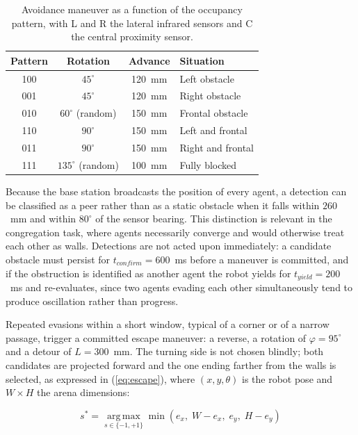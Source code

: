 \documentclass[conference]{IEEEtran}
\begin{document}
\begin{table}[htbp]
\caption{Avoidance maneuver as a function of the occupancy pattern, with L
and R the lateral infrared sensors and C the central proximity sensor.}
\label{tab:avoidance}
\centering
\begin{tabular}{cccl}
\hline
\textbf{Pattern} & \textbf{Rotation} & \textbf{Advance} & \textbf{Situation} \\
\hline
100 & $45^\circ$          & 120~mm & Left obstacle \\
001 & $45^\circ$          & 120~mm & Right obstacle \\
010 & $60^\circ$ (random) & 150~mm & Frontal obstacle \\
110 & $90^\circ$          & 150~mm & Left and frontal \\
011 & $90^\circ$          & 150~mm & Right and frontal \\
111 & $135^\circ$ (random)& 100~mm & Fully blocked \\
\hline
\end{tabular}
\end{table}

Because the base station broadcasts the position of every agent, a detection can
be classified as a peer rather than as a static obstacle when it falls within
$260$~mm and within $80^\circ$ of the sensor bearing. This distinction is
relevant in the congregation task, where agents necessarily converge and would
otherwise treat each other as walls. Detections are not acted upon immediately:
a candidate obstacle must persist for $t_{confirm} = 600$~ms before a maneuver
is committed, and if the obstruction is identified as another agent the robot
yields for $t_{yield} = 200$~ms and re-evaluates, since two agents evading each
other simultaneously tend to produce oscillation rather than progress.

Repeated evasions within a short window, typical of a corner or of a narrow
passage, trigger a committed escape maneuver: a reverse, a rotation of
$\varphi = 95^\circ$ and a detour of $L = 300$~mm. The turning side is not
chosen blindly; both candidates are projected forward and the one ending farther
from the walls is selected, as expressed in (\ref{eq:escape}), where
$(x,y,\theta)$ is the robot pose and $W \times H$ the arena dimensions:

\begin{equation}
s^{*} = \operatorname*{arg\,max}_{s \in \{-1,+1\}}
\min \left( e_x,\; W - e_x,\; e_y,\; H - e_y \right)
\label{eq:escape}
\end{equation}
\end{document}
